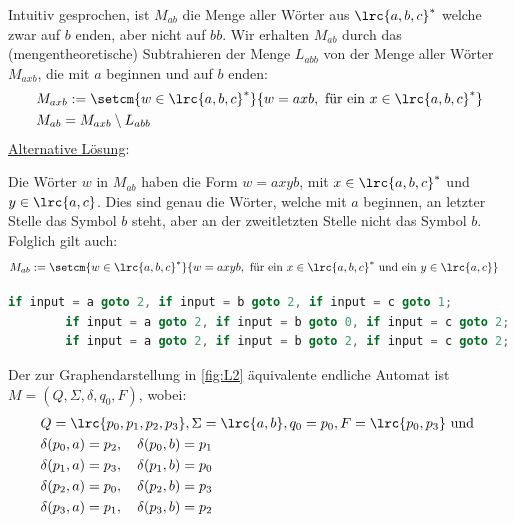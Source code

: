 \begin{myanswer}[myexercise:0402]
	Intuitiv gesprochen, ist $M_{ab}$ die Menge aller Wörter aus $\lrc{a,b,c}^*$ welche zwar auf $b$ enden, aber nicht auf $bb$. Wir erhalten $M_{ab}$ durch das (mengentheoretische) Subtrahieren der Menge $L_{abb}$ von der Menge aller Wörter $M_{axb}$, die mit $a$ beginnen und auf $b$ enden:
	\begin{align*}
		 & M_{axb} := \setcm{w\in\lrc{a,b,c}^*}{w = axb,\text{ für ein } x\in\lrc{a,b,c}^*} \\
		 & M_{ab} = M_{axb} \setminus L_{abb}
	\end{align*}
	\underline{Alternative Lösung}:

	Die Wörter $w$ in $M_{ab}$ haben die Form $w = axyb$, mit $x\in\lrc{a,b,c}^*$ und $y\in\lrc{a,c}$. Dies sind genau die Wörter, welche mit $a$ beginnen, an letzter Stelle das Symbol $b$ steht, aber an der zweitletzten Stelle nicht das Symbol $b$. Folglich gilt auch:
	\begin{align*}
		 & M_{ab} := \setcm{w\in\lrc{a,b,c}^*}{w = axyb,\text{ für ein } x\in\lrc{a,b,c}^* \text{ und ein } y\in\lrc{a,c}}
	\end{align*}
\end{myanswer}

\begin{myanswer}[myexercise:0403]
	\begin{lstlisting}[language=C++, firstnumber=0]
        if input = a goto 2, if input = b goto 2, if input = c goto 1;
        if input = a goto 2, if input = b goto 0, if input = c goto 2;
        if input = a goto 2, if input = b goto 2, if input = c goto 2;
\end{lstlisting}
\end{myanswer}

\begin{myanswer}[myexercise:0404]
	Der zur Graphendarstellung in \cref{fig:L2} äquivalente endliche Automat  ist $M = (Q,\Sigma, \delta, q_0, F)$, wobei:
	\begin{align*}
		 & Q = \lrc{p_0, p_1, p_2, p_3}, \Sigma = \lrc{a,b}, q_0 = p_0, F = \lrc{p_0, p_3}\text{ und } \\
		 & \delta(p_0,a) = p_2, \quad\delta(p_0,b) = p_1                                                    \\
		 & \delta(p_1,a) = p_3, \quad\delta(p_1,b) = p_0                                                    \\
		 & \delta(p_2,a) = p_0, \quad\delta(p_2,b) = p_3                                                    \\
		 & \delta(p_3,a) = p_1, \quad\delta(p_3,b) = p_2
	\end{align*}
\end{myanswer}


